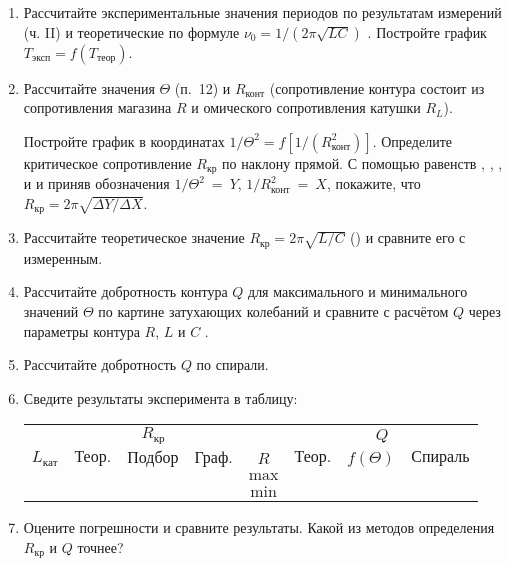 \begin{lab:task}
\begin{enumerate}

	\item Рассчитайте экспериментальные значения периодов по результатам измерений (ч. II) и теоретические по формуле $\nu_0 = 1/(2\pi\sqrt{LC})$ . Постройте график $T_\text{эксп} = f(T_\text{теор})$.

	\item Рассчитайте значения $\Theta$ (п.~12) и $R_\text{конт}$ (сопротивление контура состоит из сопротивления магазина $R$ и омического сопротивления катушки $R_L$).

Постройте график в координатах $1/\Theta^2 =f[1/(R^2_\text{конт})]$. Определите критическое сопротивление $R_\text{кр}$  по наклону прямой. С помощью равенств , , , и  и приняв обозначения $1/\Theta^2~=~Y$, $1/ R^2_\text{конт}~=~X$, покажите, что $R_\text{кр} = 2\pi\sqrt{\Delta Y / \Delta X}$.

	\item Рассчитайте теоретическое значение $R_\text{кр} = 2\pi\sqrt{L / C}$ () и сравните его с измеренным.

	\item Рассчитайте добротность контура $Q$ для максимального и минимального значений $\Theta$ по картине затухающих колебаний и сравните с расчётом $Q$ через параметры контура $R$, $L$  и $C$  .

	\item Рассчитайте добротность $Q$ по спирали.

	\item Сведите результаты эксперимента в таблицу:

\begin{center}
\begin{tabular}{|c|c|c|c|c|c|c|c|}
\hline
& \multicolumn{3}{c|}{$R_{\text{кр}}$} &  & \multicolumn{3}{c|}{$Q$} \\
\cline{2-4}
\cline{6-8}
$L_{\text{кат}}$ & $\text{Теор.}$ & $\text{Подбор}$ & $\text{Граф.}$ & $R$ & $\text{Теор.}$ & $f(\Theta)$ & $\text{Спираль}$  \\
\hline
& & & & $\text{max}$ & & &  \\
& & & & $\text{min}$ & & &  \\
\hline
\end{tabular}
\end{center}


	\item Оцените погрешности и сравните результаты. Какой из методов определения $R_\text{кр}$ и $Q$ точнее?
	\end{enumerate}
\end{lab:task}

